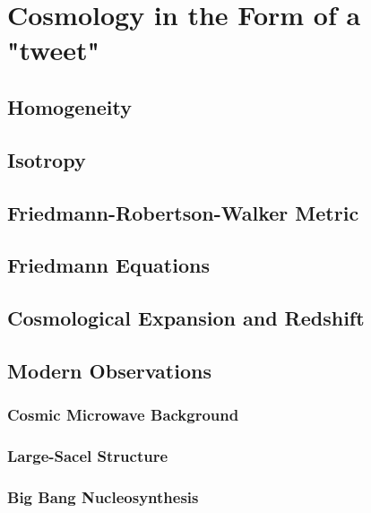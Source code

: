 \setchapterpreamble[u]{\margintoc}
\chapter{Cosmology in the Form of a "tweet"}

\section{Homogeneity}
\section{Isotropy}
\section{Friedmann-Robertson-Walker Metric}
\section{Friedmann Equations}
\section{Cosmological Expansion and Redshift}

\section{Modern Observations}
\subsection{Cosmic Microwave Background}
\subsection{Large-Sacel Structure}
\subsection{Big Bang Nucleosynthesis}